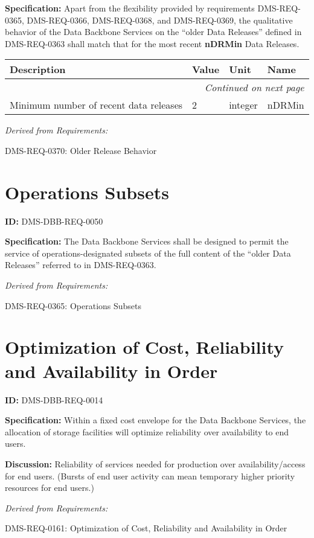 \documentclass[SE,toc,lsstdraft]{lsstdoc}
\makeatletter
\newcommand{\paramname}[1]{\hspace{0pt}#1}
\newcommand{\unitname}[1]{\hspace{0pt}#1}
\newenvironment{parameters}[0]{%
\setlength\LTleft{0pt}
\setlength\LTright{\fill}
\begin{small}
\begin{longtable}[]{|p{0.49\textwidth}|l|p{0.6in}|p{1.70in}@{}|}

\hline \textbf{Description} & \textbf{Value} & \textbf{Unit} & \textbf{Name} \\ \hline
\endhead

\hline \multicolumn{4}{r}{\emph{Continued on next page}} \\
\endfoot

\hline\hline
\endlastfoot
}{%
\hline
\end{longtable}
\end{small}
}
\makeatother
\begin{document}
\textbf{Specification:}
Apart from the flexibility provided by requirements DMS-REQ-0365, DMS-REQ-0366, DMS-REQ-0368, and DMS-REQ-0369, the qualitative behavior of the Data Backbone Services on the “older Data Releases” defined in DMS-REQ-0363 shall match that for the most recent \textbf{nDRMin} Data Releases.

\begin{parameters}
Minimum number of recent data releases
&
2
&
\unitname{%
integer
}
&
\paramname{%
nDRMin
} \\\hline
\end{parameters}

\emph{Derived from Requirements:}

DMS-REQ-0370:
Older Release Behavior \newline

\section{Operations Subsets}

\label{DMS-DBB-REQ-0050}
\textbf{ID:} DMS-DBB-REQ-0050

\textbf{Specification:}
The Data Backbone Services shall be designed to permit the service of operations-designated subsets of the full content of the “older Data Releases” referred to in DMS-REQ-0363.

\emph{Derived from Requirements:}

DMS-REQ-0365:
Operations Subsets \newline

\section{Optimization of Cost, Reliability and Availability in Order}

\label{DMS-DBB-REQ-0014}
\textbf{ID:} DMS-DBB-REQ-0014

\textbf{Specification:}
Within a fixed cost envelope for the Data Backbone Services, the allocation of storage facilities will optimize reliability over availability to end users.

\textbf{Discussion:}
Reliability of services needed for production over availability/access for end users. (Bursts of end user activity can mean temporary higher priority resources for end users.)

\emph{Derived from Requirements:}

DMS-REQ-0161:
Optimization of Cost, Reliability and Availability in Order \newline
\end{document}
